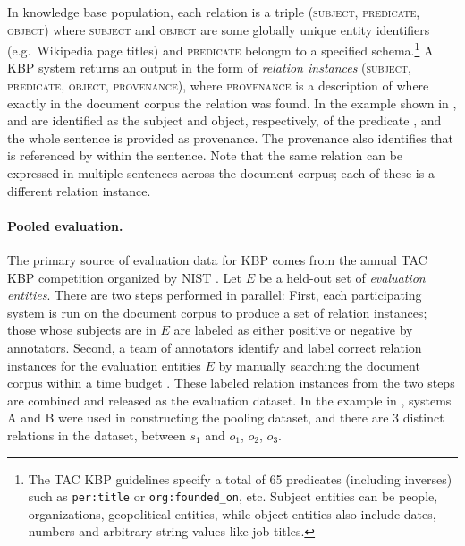 In knowledge base population,
  each relation is a triple (\textsc{subject}, \textsc{predicate}, \textsc{object}) where \textsc{subject} and \textsc{object} are some globally unique entity identifiers (e.g.\, Wikipedia page titles) and \textsc{predicate} belongm to a specified schema.\footnote{%
    The TAC KBP guidelines specify a total of 65 predicates (including inverses) such as 
     \texttt{per:title} or \texttt{org:founded\_on}, etc.
    Subject entities can be people, organizations, geopolitical entities, while object entities also include 
    dates, numbers and arbitrary string-values like job titles.
     }
A KBP system returns an output in the form of \textit{relation instances} (\textsc{subject}, \textsc{predicate}, \textsc{object}, \textsc{provenance}), where \textsc{provenance} is a description of where exactly in the document corpus the relation was found. 
In the example shown in ,
 and  are identified as the subject and object, respectively, of the predicate , and the whole sentence is provided as provenance.
The provenance also identifies that  is referenced by  within the sentence.
Note that the same relation can be expressed in multiple sentences across the document corpus; each of these is a different relation instance.

\paragraph{Pooled evaluation.}

The primary source of evaluation data for KBP comes from the annual TAC KBP competition organized by NIST \citep{ji2011kbp}.
Let $E$ be a held-out set of \emph{evaluation entities}.
There are two steps performed in parallel:
First, each participating system is run on the document corpus to produce a set of relation instances;
those whose subjects are in $E$ are labeled as either positive or negative by annotators.
Second, a team of annotators identify and label correct relation instances for the evaluation entities $E$ by manually searching the document corpus within a time budget \citep{ellis2012kbp}.
These labeled relation instances from the two steps are combined and released as the evaluation dataset.
In the example in , systems A and B were used in constructing the pooling dataset, and there are 3 distinct relations in the dataset, between $s_1$ and $o_1$, $o_2$, $o_3$.

